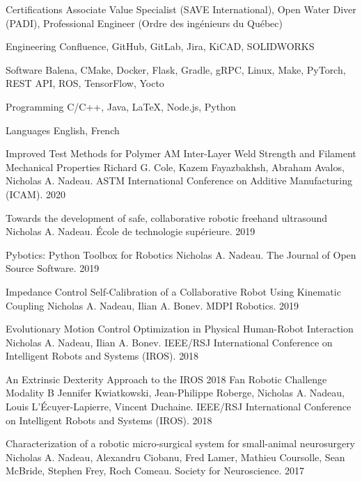 \documentclass[11pt, letterpaper]{awesome-cv}
\begin{document}
\begin{cvskills}
    \cvskill
    {Certifications}
    {
        Associate Value Specialist (SAVE International),
        Open Water Diver (PADI),
        Professional Engineer (Ordre des ingénieurs du Québec)
    }

    \cvskill
    {Engineering}
    {
        Confluence,
        GitHub,
        GitLab,
        Jira,
        KiCAD,
        SOLIDWORKS
    }

    \cvskill
    {Software}
    {
        Balena,
        CMake,
        Docker,
        Flask,
        Gradle,
        gRPC,
        Linux,
        Make,
        PyTorch,
        REST API,
        ROS,
        TensorFlow,
        Yocto
    }

    \cvskill
    {Programming}
    {
        C/C++,
        Java,
        LaTeX,
        Node.js,
        Python
    }

    \cvskill
    {Languages}
    {
        English,
        French
    }
\end{cvskills}

\begin{cvhonors}
    \cvhonor
    {Improved Test Methods for Polymer AM Inter-Layer Weld Strength and Filament Mechanical Properties}
    {Richard G. Cole, Kazem Fayazbakhsh, Abraham Avalos, Nicholas A. Nadeau. ASTM International Conference on Additive Manufacturing (ICAM).}
    {}
    {2020}

    \cvhonor
    {Towards the development of safe, collaborative robotic freehand ultrasound}
    {Nicholas A. Nadeau. École de technologie supérieure.}
    {}
    {2019}

    \cvhonor
    {Pybotics: Python Toolbox for Robotics}
    {Nicholas A. Nadeau. The Journal of Open Source Software.}
    {}
    {2019}

    \cvhonor
    {Impedance Control Self-Calibration of a Collaborative Robot Using Kinematic Coupling}
    {Nicholas A. Nadeau, Ilian A. Bonev. MDPI Robotics.}
    {}
    {2019}

    \cvhonor
    {Evolutionary Motion Control Optimization in Physical Human-Robot Interaction}
    {Nicholas A. Nadeau, Ilian A. Bonev. IEEE/RSJ International Conference on Intelligent Robots and Systems (IROS).}
    {}
    {2018}

    \cvhonor
    {An Extrinsic Dexterity Approach to the IROS 2018 Fan Robotic Challenge Modality B}
    {Jennifer Kwiatkowski, Jean-Philippe Roberge, Nicholas A. Nadeau, Louis L'Écuyer-Lapierre, Vincent Duchaine. IEEE/RSJ International Conference on Intelligent Robots and Systems (IROS).}
    {}
    {2018}

    \cvhonor
    {Characterization of a robotic micro-surgical system for small-animal neurosurgery}
    {Nicholas A. Nadeau, Alexandru Ciobanu, Fred Lamer, Mathieu Coursolle, Sean McBride, Stephen Frey, Roch Comeau. Society for Neuroscience.}
    {}
    {2017}
\end{cvhonors}
\end{document}
